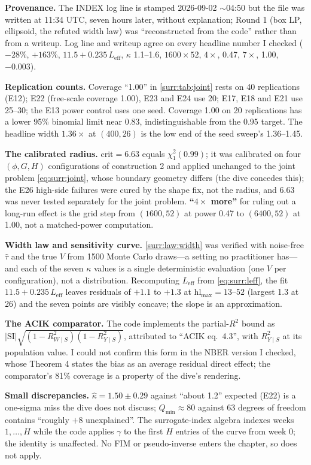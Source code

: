 \begin{reviewernote}[(compiler)]
\textbf{Provenance.} The INDEX log line is stamped 2026-09-02 $\sim$04:50 but the file was written at 11:34 UTC, seven hours later, without explanation; Round 1 (box LP, ellipsoid, the refuted width law) was ``reconstructed from the code'' rather than from a writeup. Log line and writeup agree on every headline number I checked ($-28\%$, $+163\%$, $11.5 + 0.235\,L_{\mathrm{eff}}$, $\kappa$ 1.1--1.6, $1600 \times 52$, $4\times$, 0.47, $7\times$, 1.00, $-0.003$).

\textbf{Replication counts.} Coverage ``1.00'' in \cref{surr:tab:joint} rests on 40 replications (E12); E22 (free-scale coverage 1.00), E23 and E24 use 20; E17, E18 and E21 use 25--30; the E13 power control uses one seed. Coverage 1.00 on 20 replications has a lower 95\% binomial limit near 0.83, indistinguishable from the 0.95 target. The headline width $1.36\times$ at $(400, 26)$ is the low end of the seed sweep's 1.36--1.45.

\textbf{The calibrated radius.} $\mathrm{crit} = 6.63$ equals $\chi^2_1(0.99)$; it was calibrated on four $(\phi, G, H)$ configurations of construction 2 and applied unchanged to the joint problem \cref{eq:surr:joint}, whose boundary geometry differs (the dive concedes this); the E26 high-side failures were cured by the shape fix, not the radius, and 6.63 was never tested separately for the joint problem. \textbf{``$4\times$ more''} for ruling out a long-run effect is the grid step from $(1600, 52)$ at power 0.47 to $(6400, 52)$ at 1.00, not a matched-power computation.

\textbf{Width law and sensitivity curve.} \cref{surr:law:width} was verified with noise-free $\hat\tau$ and the true $V$ from 1500 Monte Carlo draws---a setting no practitioner has---and each of the seven $\kappa$ values is a single deterministic evaluation (one $V$ per configuration), not a distribution. Recomputing $L_{\mathrm{eff}}$ from \cref{eq:surr:leff}, the fit $11.5 + 0.235\,L_{\mathrm{eff}}$ leaves residuals of $+1.1$ to $+1.3$ at $\mathrm{hl}_{\max} = 13$--$52$ (largest 1.3 at 26) and the seven points are visibly concave; the slope is an approximation.

\textbf{The ACIK comparator.} The code implements the partial-$R^2$ bound as $|\mathrm{SI}|\sqrt{(1 - R^2_{W \mid S})(1 - R^2_{Y \mid S})}$, attributed to ``ACIK eq.\ 4.3'', with $R^2_{Y \mid S}$ at its population value. I could not confirm this form in the NBER version I checked, whose Theorem 4 states the bias as an average residual direct effect; the comparator's 81\% coverage is a property of the dive's rendering.

\textbf{Small discrepancies.} $\hat\kappa = 1.50 \pm 0.29$ against ``about 1.2'' expected (E22) is a one-sigma miss the dive does not discuss; $Q_{\min} \approx 80$ against 63 degrees of freedom contains ``roughly $+8$ unexplained''. The surrogate-index algebra indexes weeks $1, \ldots, H$ while the code applies $\gamma$ to the first $H$ entries of the curve from week 0; the identity is unaffected. No FIM or pseudo-inverse enters the chapter, so  does not apply.
\end{reviewernote}

